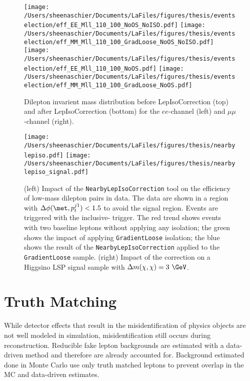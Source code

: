   \begin{figure}[tbp]
     \texttt{[image: /Users/sheenaschier/Documents/LaFiles/figures/thesis/eventselection/eff\_EE\_Mll\_110\_100\_NoOS\_NoISO.pdf]}
       \texttt{[image: /Users/sheenaschier/Documents/LaFiles/figures/thesis/eventselection/eff\_MM\_Mll\_110\_100\_GradLoose\_NoOS\_NoISO.pdf]}\\
     \texttt{[image: /Users/sheenaschier/Documents/LaFiles/figures/thesis/eventselection/eff\_EE\_Mll\_110\_100\_NoOS.pdf]}
     \texttt{[image: /Users/sheenaschier/Documents/LaFiles/figures/thesis/eventselection/eff\_MM\_Mll\_110\_100\_GradLoose\_NoOS.pdf]}\\
   \caption{Dilepton invarient mass distribution before LepIsoCorrection (top) and after LepIsoCorrection (bottom) for the $ee$-channel (left) and $\mu\mu$-channel (right).}
   \label{fig:EffMll_ISOCorr}
 \end{figure}

 \begin{figure}[tbp]
  \texttt{[image: /Users/sheenaschier/Documents/LaFiles/figures/thesis/nearbylepiso.pdf]}
   \texttt{[image: /Users/sheenaschier/Documents/LaFiles/figures/thesis/nearbylepiso\_signal.pdf]}
  \caption{(left) Impact of the \texttt{NearbyLepIsoCorrection} tool on the efficiency of low-mass dilepton pairs in data.  The data are shown in a region with $\Delta\phi(\met, p_{t}^{j1})<1.5$ to avoid the signal region.  Events are triggered with the inclusive-\met{} trigger.  The red trend shows events with two baseline leptons without applying any isolation; the green shows the impact of applying \texttt{GradientLoose} isolation; the blue shows the result of the \texttt{NearbyLepIsoCorrection} applied to the \texttt{GradientLoose} sample.  (right) Impact of the correction on a Higgsino LSP signal sample with $\Delta m(\chi,\chi)=3~\GeV$.}
 \label{fig:nearbylepiso}
 \end{figure}
 
 \section{Truth Matching}
 While detector effects that result in the misidentification of physics objects are not well modeled in simulation, misidentification still occurs during reconstruction.  Reducible fake lepton backgrounds are estimated with a data-driven method and therefore are already accounted for.  Background estimated done in Monte Carlo use only truth matched leptons to prevent overlap in the MC and data-driven estimates. 
 
 


